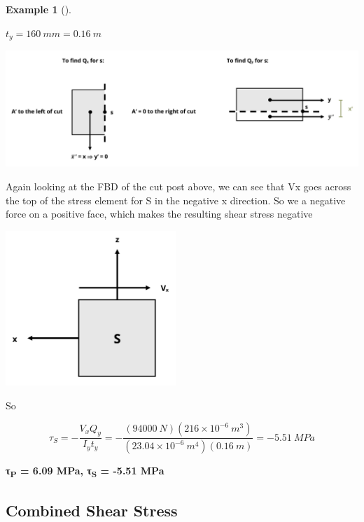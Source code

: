 \documentclass[
  letterpaper,
  DIV=11,
  numbers=noendperiod]{scrreprt}
\theoremstyle{definition}
\newtheorem{example}{Example}[chapter]
\theoremstyle{remark}
\begin{document}
\begin{tcolorbox}
\begin{example}[]
\begin{tcolorbox}
\(t_y = 160{~mm} = 0.16{~m}\)

\begin{center}
\includegraphics{images/CH14 PNGs/example 14.5 part 5.png}
\end{center}

Again looking at the FBD of the cut post above, we can see that Vx goes
across the top of the stress element for S in the negative x direction.
So we a negative force on a positive face, which makes the resulting
shear stress negative

\begin{center}
\includegraphics[width=2.53125in,height=\textheight]{images/CH14 PNGs/example 14.5 part 6.png}
\end{center}

So

\[
\tau_S=-\frac{V_x Q_y}{I_y t_y}=-\frac{(94000{~N})(216 \times 10^{-6}{~m}^3)}{(23.04 \times 10^{-6}{~m}^4)(0.16{~m})}=-5.51{~MPa}
\]

\textbf{τ\textsubscript{P} = 6.09 MPa, τ\textsubscript{S} = -5.51 MPa}

\end{tcolorbox}

\end{example}

\end{tcolorbox}

\subsection{Combined Shear Stress}\label{sec-14.2.3}
\end{document}
